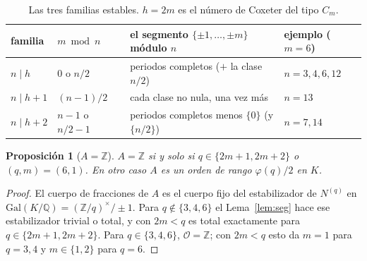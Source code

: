 \documentclass[11pt,a4paper]{article}
\newtheorem{proposition}[theorem]{Proposición}
\theoremstyle{definition}
\newcommand{\ZZ}{\mathbb{Z}}
\newcommand{\QQ}{\mathbb{Q}}
\newcommand{\cO}{\mathcal{O}}
\begin{document}
\begin{table}[htbp]
\centering\small
{}
\begin{tabular}{llll}
\toprule
familia & $m \bmod n$ & el segmento $\{\pm1,\dots,\pm m\}$ módulo $n$ & ejemplo ($m=6$) \\
\midrule
$n\mid h$ & $0$ o $n/2$ & periodos completos ($+$ la clase $n/2$) & $n=3,4,6,12$ \\
$n\mid h+1$ & $(n-1)/2$ & cada clase no nula, una vez más & $n=13$ \\
$n\mid h+2$ & $n-1$ o $n/2-1$ & periodos completos menos $\{0\}$ (y $\{n/2\}$) & $n=7,14$ \\
\bottomrule
\end{tabular}
\caption{Las tres familias estables. $h=2m$ es el número de Coxeter del tipo $C_m$.}
\label{tab:familias}
\end{table}

\begin{proposition}[$A=\ZZ$]\label{prop:AZ}
$A=\ZZ$ si y solo si $q\in\{2m+1,2m+2\}$ o $(q,m)=(6,1)$. En otro caso $A$ es un orden de rango $\varphi(q)/2$
en $K$.
\end{proposition}

\begin{proof}
El cuerpo de fracciones de $A$ es el cuerpo fijo del estabilizador de $N^{(q)}$ en
$\mathrm{Gal}(K/\QQ)=(\ZZ/q)^\times/\pm1$. Para $q\notin\{3,4,6\}$ el Lema~\ref{lem:seg} hace ese estabilizador
trivial o total, y con $2m<q$ es total exactamente para $q\in\{2m+1,2m+2\}$. Para
$q\in\{3,4,6\}$, $\cO=\ZZ$; con $2m<q$ esto da $m=1$ para $q=3,4$ y $m\in\{1,2\}$ para $q=6$.
\end{proof}
\end{document}
